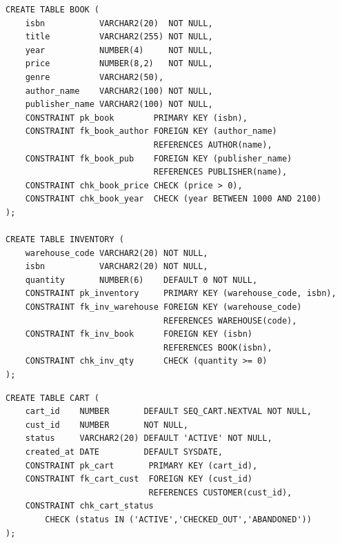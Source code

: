 \begin{lstlisting}[caption={BOOK and INVENTORY table definitions}]
CREATE TABLE BOOK (
    isbn           VARCHAR2(20)  NOT NULL,
    title          VARCHAR2(255) NOT NULL,
    year           NUMBER(4)     NOT NULL,
    price          NUMBER(8,2)   NOT NULL,
    genre          VARCHAR2(50),
    author_name    VARCHAR2(100) NOT NULL,
    publisher_name VARCHAR2(100) NOT NULL,
    CONSTRAINT pk_book        PRIMARY KEY (isbn),
    CONSTRAINT fk_book_author FOREIGN KEY (author_name)
                              REFERENCES AUTHOR(name),
    CONSTRAINT fk_book_pub    FOREIGN KEY (publisher_name)
                              REFERENCES PUBLISHER(name),
    CONSTRAINT chk_book_price CHECK (price > 0),
    CONSTRAINT chk_book_year  CHECK (year BETWEEN 1000 AND 2100)
);

CREATE TABLE INVENTORY (
    warehouse_code VARCHAR2(20) NOT NULL,
    isbn           VARCHAR2(20) NOT NULL,
    quantity       NUMBER(6)    DEFAULT 0 NOT NULL,
    CONSTRAINT pk_inventory     PRIMARY KEY (warehouse_code, isbn),
    CONSTRAINT fk_inv_warehouse FOREIGN KEY (warehouse_code)
                                REFERENCES WAREHOUSE(code),
    CONSTRAINT fk_inv_book      FOREIGN KEY (isbn)
                                REFERENCES BOOK(isbn),
    CONSTRAINT chk_inv_qty      CHECK (quantity >= 0)
);
\end{lstlisting}

\begin{lstlisting}[caption={CART and ORDERS with status constraints}]
CREATE TABLE CART (
    cart_id    NUMBER       DEFAULT SEQ_CART.NEXTVAL NOT NULL,
    cust_id    NUMBER       NOT NULL,
    status     VARCHAR2(20) DEFAULT 'ACTIVE' NOT NULL,
    created_at DATE         DEFAULT SYSDATE,
    CONSTRAINT pk_cart       PRIMARY KEY (cart_id),
    CONSTRAINT fk_cart_cust  FOREIGN KEY (cust_id)
                             REFERENCES CUSTOMER(cust_id),
    CONSTRAINT chk_cart_status
        CHECK (status IN ('ACTIVE','CHECKED_OUT','ABANDONED'))
);
\end{lstlisting}